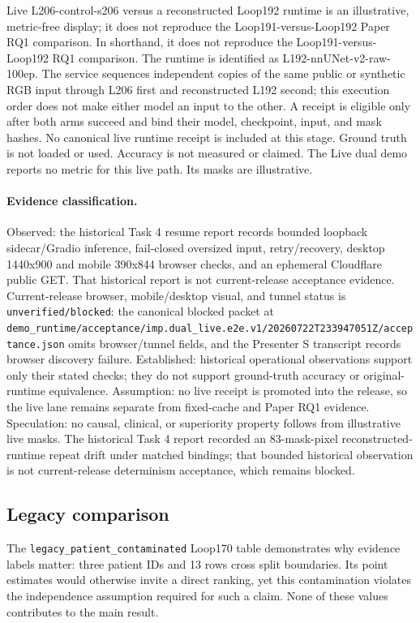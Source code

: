 Live L206-control-s206 versus a reconstructed Loop192 runtime is an illustrative, metric-free display; it does not reproduce the Loop191-versus-Loop192 Paper RQ1 comparison. In shorthand, it does not reproduce the Loop191-versus-Loop192 RQ1 comparison. The runtime is identified as L192-nnUNet-v2-raw-100ep. The service sequences independent copies of the same public or synthetic RGB input through L206 first and reconstructed L192 second; this execution order does not make either model an input to the other. A receipt is eligible only after both arms succeed and bind their model, checkpoint, input, and mask hashes. No canonical live runtime receipt is included at this stage. Ground truth is not loaded or used. Accuracy is not measured or claimed. The Live dual demo reports no metric for this live path. Its masks are illustrative.

\paragraph{Evidence classification.} Observed: the historical Task 4 resume report records bounded loopback sidecar/Gradio inference, fail-closed oversized input, retry/recovery, desktop 1440x900 and mobile 390x844 browser checks, and an ephemeral Cloudflare public GET. That historical report is not current-release acceptance evidence. Current-release browser, mobile/desktop visual, and tunnel status is \texttt{unverified/blocked}: the canonical blocked packet at \texttt{demo\_runtime/acceptance/imp.dual\_live.e2e.v1/20260722T233947051Z/acceptance.json} omits browser/tunnel fields, and the Presenter S transcript records browser discovery failure. Established: historical operational observations support only their stated checks; they do not support ground-truth accuracy or original-runtime equivalence. Assumption: no live receipt is promoted into the release, so the live lane remains separate from fixed-cache and Paper RQ1 evidence. Speculation: no causal, clinical, or superiority property follows from illustrative live masks. The historical Task 4 report recorded an 83-mask-pixel reconstructed-runtime repeat drift under matched bindings; that bounded historical observation is not current-release determinism acceptance, which remains blocked.

\subsection{Legacy comparison}



The \texttt{legacy\_patient\_contaminated} Loop170 table demonstrates why evidence labels matter: three patient IDs and 13 rows cross split boundaries. Its point estimates would otherwise invite a direct ranking, yet this contamination violates the independence assumption required for such a claim. None of these values contributes to the main result.
